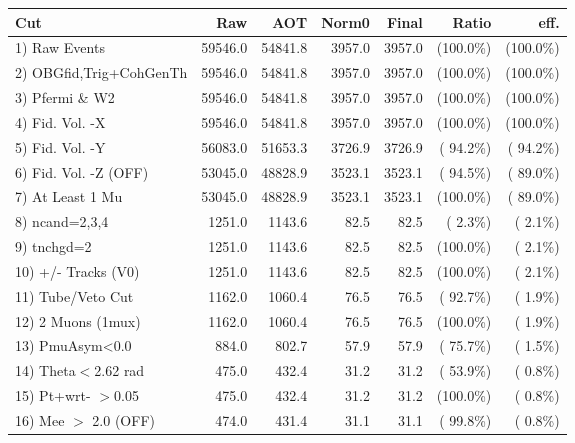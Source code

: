  \begin{table}[h!]\centering
 \begin{tabular}{||l||r|r|r|r|r|r||}
 \hline
 \hline
 Cut & Raw & AOT & Norm0 & Final & Ratio & eff.       \\
 \hline
  1) Raw Events           &      59546.0 &      54841.8 &       3957.0 &       3957.0 & (100.0\%) & (100.0\%) \\
  2) OBGfid,Trig+CohGenTh &      59546.0 &      54841.8 &       3957.0 &       3957.0 & (100.0\%) & (100.0\%) \\
  3) Pfermi \& W2         &      59546.0 &      54841.8 &       3957.0 &       3957.0 & (100.0\%) & (100.0\%) \\
  4) Fid. Vol. -X         &      59546.0 &      54841.8 &       3957.0 &       3957.0 & (100.0\%) & (100.0\%) \\
  5) Fid. Vol. -Y         &      56083.0 &      51653.3 &       3726.9 &       3726.9 & ( 94.2\%) & ( 94.2\%) \\
  6) Fid. Vol. -Z (OFF)   &      53045.0 &      48828.9 &       3523.1 &       3523.1 & ( 94.5\%) & ( 89.0\%) \\
  7) At Least 1 Mu        &      53045.0 &      48828.9 &       3523.1 &       3523.1 & (100.0\%) & ( 89.0\%) \\
  8) ncand=2,3,4          &       1251.0 &       1143.6 &         82.5 &         82.5 & (  2.3\%) & (  2.1\%) \\
  9) tnchgd=2             &       1251.0 &       1143.6 &         82.5 &         82.5 & (100.0\%) & (  2.1\%) \\
 10) +/- Tracks (V0)      &       1251.0 &       1143.6 &         82.5 &         82.5 & (100.0\%) & (  2.1\%) \\
 11) Tube/Veto Cut        &       1162.0 &       1060.4 &         76.5 &         76.5 & ( 92.7\%) & (  1.9\%) \\
 12) 2 Muons (1mux)       &       1162.0 &       1060.4 &         76.5 &         76.5 & (100.0\%) & (  1.9\%) \\
 13) PmuAsym<0.0          &        884.0 &        802.7 &         57.9 &         57.9 & ( 75.7\%) & (  1.5\%) \\
 14) Theta$<$2.62 rad     &        475.0 &        432.4 &         31.2 &         31.2 & ( 53.9\%) & (  0.8\%) \\
 15) Pt+wrt- $>$0.05      &        475.0 &        432.4 &         31.2 &         31.2 & (100.0\%) & (  0.8\%) \\
 16) Mee $>$ 2.0  (OFF)   &        474.0 &        431.4 &         31.1 &         31.1 & ( 99.8\%) & (  0.8\%) \\

\end{tabular}
\end{table}
